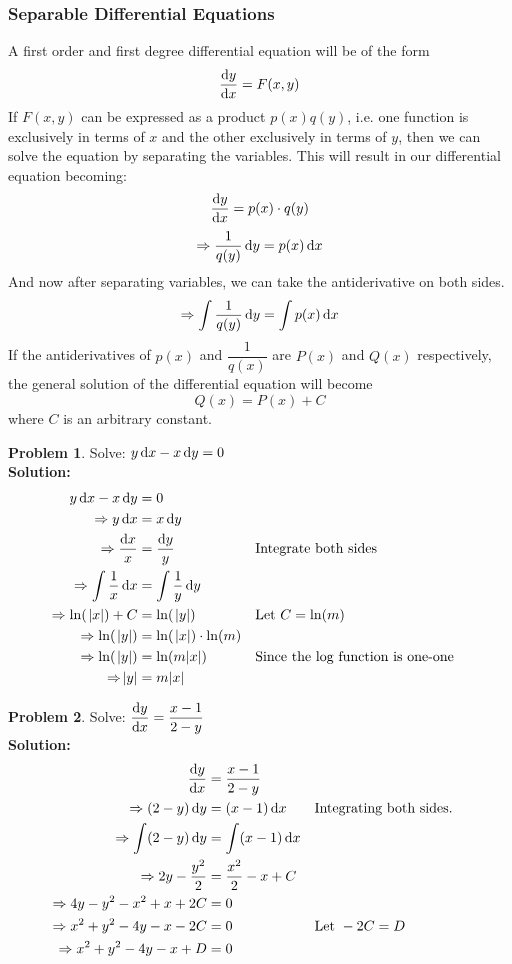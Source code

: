 \documentclass[14]{article}
\theoremstyle{definition}
\newtheorem{prob}{Problem}
\theoremstyle{case}
\begin{document}
\subsubsection{Separable Differential Equations}
A first order and first degree differential equation will be of the form
\[\dfrac{\dif y}{\dif x} = F(x, y)\]
If $F(x, y)$ can be expressed as a product $p(x) q(y)$, i.e. one function is exclusively in terms of $x$ and the other exclusively in terms of $y$, then we can solve the equation by separating the variables. This will result in our differential equation becoming:
\[\dfrac{\dif y}{\dif x} = p(x) \cdot q(y)\]
\[\Rightarrow \dfrac1{q(y)} \dif y = p(x) \dif x\]
And now after separating variables, we can take the antiderivative on both sides.
\[\Rightarrow \int\dfrac1{q(y)} \dif y = \int p(x) \dif x\]
If the antiderivatives of $p(x)$ and $\dfrac1{q(x)}$ are $P(x)$ and $Q(x)$ respectively, the general solution of the differential equation will become
\[Q(x) = P(x) + C\]
where $C$ is an arbitrary constant.
\pagebreak
\begin{prob}
Solve: $y \dif x - x \dif y = 0$\\
\textbf{Solution:}\\
\begin{align*}
y \dif x - x \dif y &= 0\\
\Rightarrow y \dif x &= x \dif y\\
\Rightarrow \dfrac{\dif x}{x} &= \dfrac{\dif y}{y} && \text{Integrate both sides}\\
\Rightarrow\int \dfrac1x \dif x &= \int \dfrac1y \dif y\\
\Rightarrow \ln(\;\abs{x}) + C &= \ln(\;\abs{y}) && \text{Let } C = \ln(m)\\
\Rightarrow \ln(\;\abs{y}) &= \ln(\;\abs{x}) \cdot \ln(m)\\
\Rightarrow \ln(\;\abs{y}) &= \ln(m\abs{x}) && \text{Since the log function is one-one}\\
\Rightarrow \abs{y} &= m\abs{x}
\end{align*}
\end{prob}
\begin{prob}
Solve: $\dfrac{\dif y}{\dif x} = \dfrac{x-1}{2-y}$\\
\textbf{Solution:}\\
\begin{align*}
\dfrac{\dif y}{\dif x} &= \dfrac{x-1}{2-y}\\
\Rightarrow (2-y) \dif y &= (x - 1) \dif x && \text{Integrating both sides.}\\
\Rightarrow \int(2-y) \dif y &= \int(x - 1) \dif x\\
\Rightarrow 2y - \dfrac{y^2}{2} &= \dfrac{x^2}2 - x + C\\
\Rightarrow 4y - y^2 - x^2 + x + 2C &= 0\\
\Rightarrow x^2 + y^2 - 4y - x - 2C &= 0 && \text{Let } -2C = D\\
\Rightarrow x^2 + y^2 - 4y - x + D &= 0
\end{align*}
\end{prob}
\end{document}
